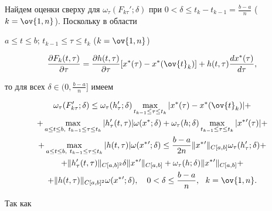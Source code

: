 Найдем оценки сверху для $\omega_\tau (F_{k\tau}';\delta)$ при $0<\delta


\leq t_k-t_{k-1}=\frac{b-a}{n}$ ($k=\ov{1,n}$). Поскольку в области


$a\leq t\leq b$; $t_{k-1}\leq \tau\leq t_k$ ($k=\ov{1,n}$)


\begin{equation}


\frac{\partial F_k(t,\tau)}{\partial \tau}=


\frac{\partial h(t,\tau)}{\partial \tau} [x^*(\tau)-x^*(\ov{t}_k)]


+ h(t,\tau)\frac{dx^*(\tau)}{d\tau},


\end{equation}


то для всех $\delta\in (0,\frac{b-a}{n}]$ имеем


\begin{multline}


\omega_\tau (F_{k\tau}';\delta)\leq \omega_\tau (h_{\tau}';\delta)


\max_{t_{k-1}\leq \tau\leq t_k}|x^*(\tau)-x^*(\ov{t}_k)|+ \\


%


+\max_{a\leq t\leq b,\ t_{k-1}\leq \tau\leq t_k}|h'_\tau (t,\tau)|


\omega(x^*;\delta) +


\omega_\tau (h;\delta)\max_{t_{k-1}\leq \tau\leq t_k}|x^*{}'(\tau)|+\\


%


+\max_{a\leq t\leq b,\ t_{k-1}\leq \tau\leq t_k}|h(t,\tau)|


\omega(x^*{}';\delta) \leq \frac{b-a}{2n}\|x^*{}'\|_{C[a,b]}


\omega_\tau (h'_\tau ;\delta)+\\


%


+\|h'_\tau(t,\tau)\|_{C[a,b]^2} \delta \|x^*{}'\|_{C[a,b]}+


\omega_\tau(h;\delta) \|x^*{}'\|_{C[a,b]}+ \\


%


+\|h(t,\tau)\|_{C[a,b]^2} \omega(x^*{}';\delta),\quad 0<\delta\leq


\frac{b-a}{n},\ \ k=\ov{1,n}.


\end{multline}


Так как


